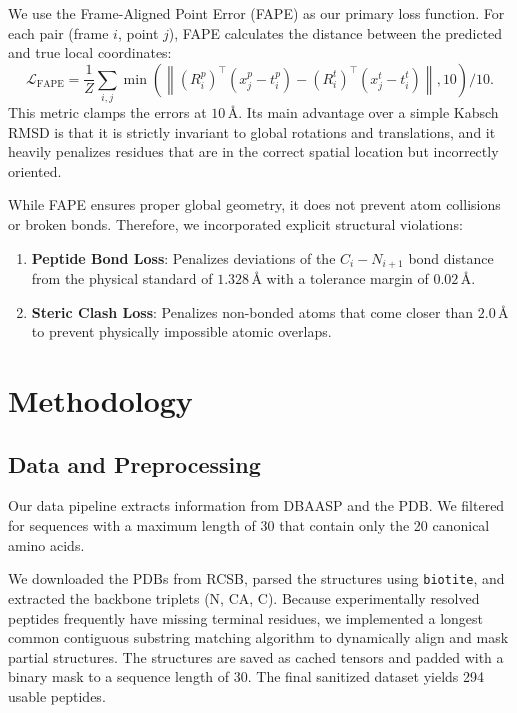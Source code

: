 \documentclass{article}
\begin{document}
We use the Frame-Aligned Point Error (FAPE) as our primary loss function. For each pair (frame $i$, point $j$), FAPE calculates the distance between the predicted and true local coordinates:
\begin{equation}
\mathcal{L}_{\text{FAPE}}
=
\frac{1}{Z}
\sum_{i,j}
\min\!\left(
\left\|
(R_i^{p})^\top(x_j^p-t_i^p)-
(R_i^{t})^\top(x_j^t-t_i^t)
\right\|,
10
\right)\!/10.
\end{equation}
This metric clamps the errors at $10\,\text{\AA}$. Its main advantage over a simple Kabsch RMSD is that it is strictly invariant to global rotations and translations, and it heavily penalizes residues that are in the correct spatial location but incorrectly oriented.

While FAPE ensures proper global geometry, it does not prevent atom collisions or broken bonds. Therefore, we incorporated explicit structural violations:
\begin{enumerate}
\item \textbf{Peptide Bond Loss}: Penalizes deviations of the $C_i-N_{i+1}$ bond distance from the physical standard of $1.328\,\text{\AA}$ with a tolerance margin of $0.02\,\text{\AA}$.
\item \textbf{Steric Clash Loss}: Penalizes non-bonded atoms that come closer than $2.0\,\text{\AA}$ to prevent physically impossible atomic overlaps.
\end{enumerate}

\section{Methodology}
\label{sec:method}

\subsection{Data and Preprocessing}

Our data pipeline extracts information from DBAASP and the PDB. We filtered for sequences with a maximum length of 30 that contain only the 20 canonical amino acids. 

We downloaded the PDBs from RCSB, parsed the structures using \texttt{biotite}, and extracted the backbone triplets (N, CA, C). Because experimentally resolved peptides frequently have missing terminal residues, we implemented a longest common contiguous substring matching algorithm to dynamically align and mask partial structures. The structures are saved as cached tensors and padded with a binary mask to a sequence length of 30. The final sanitized dataset yields 294 usable peptides.
\end{document}
